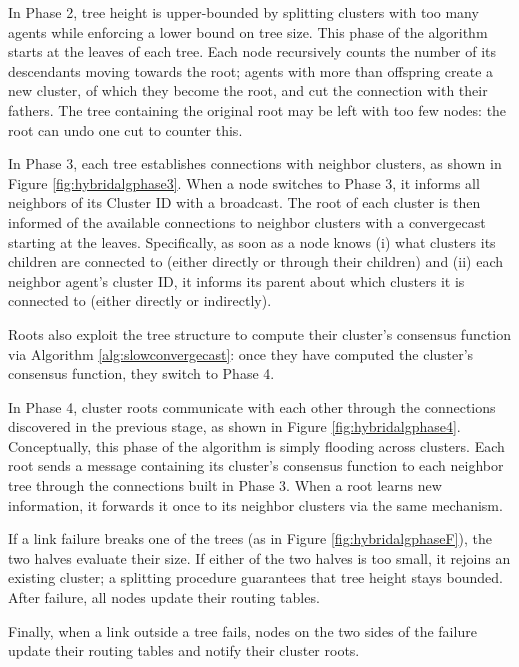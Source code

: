 \documentclass[letterpaper,10pt,conference]{ieeeconf}
\begin{document}
 In Phase 2, tree height is upper-bounded by splitting clusters with too many agents while enforcing a lower bound on tree size. This phase of the algorithm starts at the leaves of each tree. Each node recursively counts the number of its descendants moving towards the root; agents with more than  offspring create a new cluster, of which they become the root, and cut the connection with their fathers. The tree containing the original root may be left with too few nodes: the root can undo one cut to counter this.

In Phase 3, each tree establishes connections with neighbor clusters, as shown in Figure \ref{fig:hybridalgphase3}. When a node switches to Phase 3, it informs all neighbors of its Cluster ID with a broadcast. The root of each cluster is then informed of the available connections to neighbor clusters with a convergecast starting at the leaves. Specifically, as soon as a node knows (i) what clusters its children are connected to (either directly or through their children) and (ii) each neighbor agent's cluster ID, it informs its parent about which clusters it is connected to (either directly or indirectly).

Roots also exploit the tree structure to compute their cluster's consensus function via Algorithm \ref{alg:slowconvergecast}: once they have computed the cluster's consensus function, they switch to Phase 4.

In Phase 4, cluster roots communicate with each other through the connections discovered in the previous stage, as shown in Figure \ref{fig:hybridalgphase4}. Conceptually, this phase of the algorithm is simply flooding across clusters. Each root sends a message containing its cluster's consensus function to each neighbor tree through the connections built in Phase 3.
When a root learns new information, it forwards it once to its neighbor clusters via the same mechanism.

If a link failure breaks one of the trees (as in Figure \ref{fig:hybridalgphaseF}), the two halves evaluate their size. If either of the two halves is too small, it rejoins an existing cluster; a splitting procedure guarantees that tree height stays bounded. After failure, all nodes update their routing tables.

Finally, when a link outside a tree fails, nodes on the two sides of the failure update their routing tables and notify their cluster roots.
\end{document}
